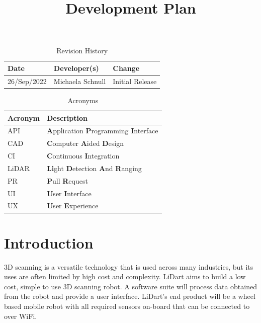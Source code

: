 \documentclass[titlepage]{article}
\title{Development Plan\\\progname}
\author{\authname}
\date{}
\begin{document}
\maketitle

\newpage

\begin{table}[hp]
\caption{Revision History} \label{TblRevisionHistory}
\begin{tabularx}{\textwidth}{llX}
\toprule
\textbf{Date} & \textbf{Developer(s)} & \textbf{Change}\\
\midrule
26/Sep/2022 & Michaela Schnull & Initial Release\\
\bottomrule
\end{tabularx}
\end{table}

\begin{table}[hp]
\caption{Acronyms} \label{Acronyms}
\begin{tabularx}{\textwidth}{lX}
\toprule
\textbf{Acronym} & \textbf{Description} \\
\midrule
API & \textbf{A}pplication \textbf{P}rogramming \textbf{I}nterface \\
CAD & \textbf{C}omputer \textbf{A}ided \textbf{D}esign\\
CI & \textbf{C}ontinuous \textbf{I}ntegration\\
LiDAR & \textbf{Li}ght \textbf{D}etection \textbf{A}nd \textbf{R}anging\\
PR & \textbf{P}ull \textbf{R}equest\\
UI & \textbf{U}ser \textbf{I}nterface\\
UX & \textbf{U}ser \textbf{E}xperience\\
\bottomrule
\end{tabularx}
\end{table}

\newpage

\section{Introduction}

3D scanning is a versatile technology that is used across many industries, but its uses are often limited by high cost and complexity. LiDart aims to build a low cost, simple to use 3D scanning robot. A software suite will process data obtained from the robot and provide a user interface. LiDart's end product will be a wheel based mobile robot with all required sensors on-board that can be connected to over WiFi.
\end{document}
